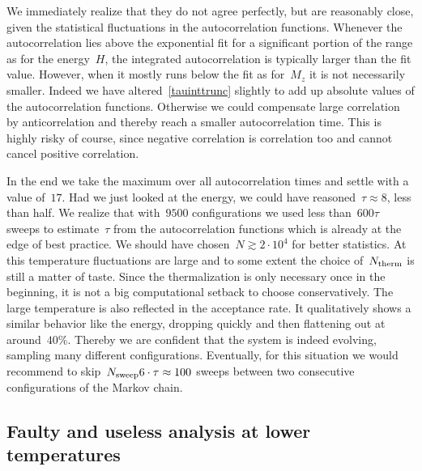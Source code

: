 We immediately realize that they do not agree perfectly, but are reasonably
close, given the statistical fluctuations in the autocorrelation functions.
Whenever the autocorrelation lies above the exponential fit for a significant
portion of the range as for the energy~$H$, the integrated autocorrelation is
typically larger than the fit value. However, when it mostly runs below the fit
as for~$M_z$ it is not necessarily smaller. Indeed we have
altered~\eqref{tauinttrunc} slightly to add up absolute values of the
autocorrelation functions. Otherwise we could compensate large correlation by
anticorrelation and thereby reach a smaller autocorrelation time. This is highly
risky of course, since negative correlation is correlation too and cannot cancel
positive correlation.

In the end we take the maximum over all autocorrelation times and settle with a
value of~$17$. Had we just looked at the energy, we could have reasoned~$\tau
\approx 8$, less than half. We realize that with~$9500$ configurations we used
less than~$600 \tau$ sweeps to estimate~$\tau$ from the autocorrelation
functions which is already at the edge of best practice. We should have
chosen~$N \gtrsim 2\cdot 10^4$ for better statistics. At this temperature
fluctuations are large and to some extent the choice of~$N_{\mathrm{therm}}$ is still a
matter of taste. Since the thermalization is only necessary once in the
beginning, it is not a big computational setback to choose conservatively.  The
large temperature is also reflected in the acceptance rate. It  qualitatively
shows a similar behavior like the energy, dropping quickly and then flattening
out at around~$40$\%. Thereby we are confident that the system is indeed
evolving, sampling many different configurations. Eventually, for this situation
we would recommend to skip~$N_{\mathrm{sweep}} 6 \cdot \tau \approx 100$ sweeps between two
consecutive configurations of the Markov chain.

\subsection{Faulty and useless analysis at lower temperatures}

